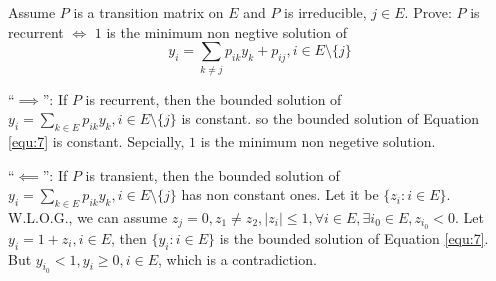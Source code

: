 \documentclass{ctexart}
\begin{document}
\begin{problem}\label{pro:7}
  Assume \(P\) is a transition matrix on \(E\) and \(P\) is irreducible, \(j \in E\).
  Prove: \(P\) is recurrent \(\iff\) \(1\) is the minimum non negtive solution of
  \begin{equation}\label{equ:7}
    y_i = \sum_{k \neq j} p_{ik}y_k + p_{ij}, i \in E\setminus\{j\}
  \end{equation}

\end{problem}
\begin{solution}
  ``\(\implies\)'': If \(P\) is recurrent, then the bounded solution of \(y_i=\sum_{k \in E}p_{ik}y_k, i  \in E\setminus\{j\}\) is constant.
  so the bounded solution of Equation \eqref{equ:7} is constant. Sepcially, \(1\) is the minimum non negetive solution.

  ``\(\impliedby\)'': If \(P\) is transient, then the bounded solution of \(y_i=\sum_{k \in E}p_{ik}y_k, i  \in E\setminus\{j\}\) has non constant ones.
  Let it be \(\{z_i:i \in E\}\). W.L.O.G., we can assume \(z_j=0, z_1 \neq z_2,|z_i| \leq 1, \forall i \in E, \exists i_0 \in E, z_{i_0} <0\).
  Let \(y_i = 1 + z_i, i \in E\), then \(\{y_i: i \in E\}\) is the bounded solution of Equation \eqref{equ:7}.
  But \(y_{i_0} <1, y_i \geq 0, i \in E\), which is a contradiction.
\end{solution}
\end{document}
